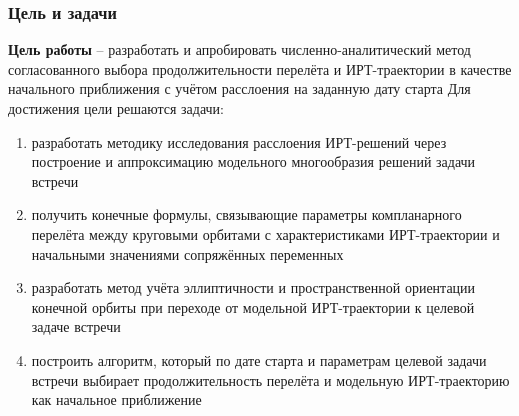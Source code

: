 \begin{frame}
    \frametitle{Цель и задачи}
    \presentationtextsize
    \textbf{Цель работы} -- разработать и апробировать численно-аналитический метод согласованного выбора продолжительности перелёта и ИРТ-траектории в качестве начального приближения с учётом расслоения на заданную дату старта
    \vfill
    Для достижения цели решаются задачи:
    \begin{enumerate}
        \item разработать методику исследования расслоения ИРТ-решений через построение и аппроксимацию модельного многообразия решений задачи встречи
        \item получить конечные формулы, связывающие параметры компланарного перелёта между круговыми орбитами с характеристиками ИРТ-траектории и начальными значениями сопряжённых переменных
        \item разработать метод учёта эллиптичности и пространственной ориентации конечной орбиты при переходе от модельной ИРТ-траектории к целевой задаче встречи
        \item построить алгоритм, который по дате старта и параметрам целевой задачи встречи выбирает продолжительность перелёта и модельную ИРТ-траекторию как начальное приближение
    \end{enumerate}
\end{frame}
